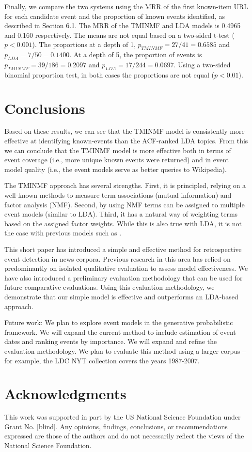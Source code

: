 \documentclass{sig-alternate}
\begin{document}
Finally, we compare the two systems using the MRR of the first known-item URL for each candidate event and the proportion of known events identified, as described in Section 6.1.  The MRR of the TMINMF and LDA models is 0.4965 and 0.160 respectively. The means are not equal based on a two-sided t-test ($p < 0.001$).   The proportions at a depth of 1,   $p_{TMINMF}=27/41=0.6585$ and $p_{LDA}=7/50=0.1400$.  At a depth of 5, the proportion of events is $p_{TMINMF}=39/186=0.2097$ and $p_{LDA}=17/244=0.0697$. Using a two-sided binomial proportion test, in both cases the proportions are not equal ($p < 0.01$).


\section{Conclusions}

Based on these results, we can see that the TMINMF model is consistently more effective at identifying known-events than the ACF-ranked LDA topics.  From this we can conclude that the TMINMF model is more effective both in terms of event coverage (i.e., more unique known events were returned) and in event model quality (i.e., the event models serve as better queries to Wikipedia).  

The TMINMF approach has several strengths. First, it is principled, relying on a well-known methods to measure term associations (mutual information) and factor analysis (NMF). Second, by using NMF terms can be assigned to multiple event models (similar to LDA).  Third, it has a natural way of weighting terms based on the assigned factor weights. While this is also true with LDA, it is not the case with previous models such as \cite{He2007}.  

This short paper has introduced a simple and effective method for retrospective event detection in news corpora. Previous research in this area has relied on predominantly on isolated qualitative evaluation to assess model effectiveness. We have also introduced a preliminary evaluation methodology that can be used for future comparative evaluations. Using this evaluation methodology, we demonstrate that our simple model is effective and outperforms an LDA-based approach. 

Future work: We plan to explore event models in the generative probabilistic framework. We will expand the current method to include estimation of event dates and ranking events by importance. We will expand and refine the evaluation methodology. We plan to evaluate this method using a larger corpus -- for example, the LDC NYT collection covers the years 1987-2007.


\section{Acknowledgments}
This work was supported in part by the US National Science Foundation under Grant No. [blind]. Any opinions, findings, conclusions, or recommendations expressed are those of the authors and do not necessarily reflect the views of the National Science Foundation.



  
\end{document}

